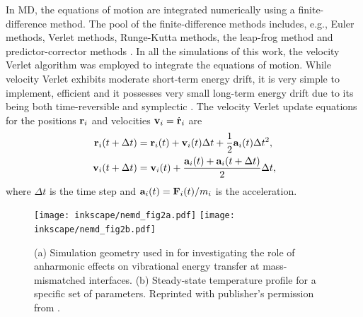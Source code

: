 In MD, the equations of motion are integrated numerically using a finite-difference method. The pool of the finite-difference methods includes, e.g., Euler methods, Verlet methods, Runge-Kutta methods, the leap-frog method and predictor-corrector methods \cite{allentildesley}. In all the simulations of this work, the velocity Verlet algorithm was employed to integrate the equations of motion. While velocity Verlet exhibits moderate short-term energy drift, it is very simple to implement, efficient and it possesses very small long-term energy drift due to its being both time-reversible and symplectic \cite{frenkelsmit}. The velocity Verlet update equations for the positions $\mathbf{r}_i$ and velocities $\mathbf{v}_i=\dot{\mathbf{r}}_i$ are \cite{allentildesley}
\begin{subequations}
\begin{align}
  \bb{r}_i(t+\Delta t) &= \bb{r}_i(t) + \bb{v}_i(t)\Delta t+  \frac{1}{2}\bb{a}_i(t) \Delta t^2,  \\ %
  \bb{v}_i(t+\Delta t) &= \bb{v}_i(t) + \frac{ \bb{a}_i(t)+\bb{a}_i(t+\Delta t)}{2} \Delta t , %
\end{align}
\end{subequations}
where $\Delta t$ is the time step and $\mathbf{a}_i(t)=\mathbf{F}_i(t)/m_i$ is the acceleration.

\begin{figure}[tb]
 \begin{center}
  \texttt{[image: inkscape/nemd\_fig2a.pdf]} 
  \texttt{[image: inkscape/nemd\_fig2b.pdf]}
  \caption{(a) Simulation geometry used in  for investigating the role of anharmonic effects on vibrational energy transfer at mass-mismatched interfaces. (b) Steady-state temperature profile for a specific set of parameters. Reprinted with publisher's permission from .}  
\label{fig:th_spectral_geom}
 \end{center}
\end{figure}

